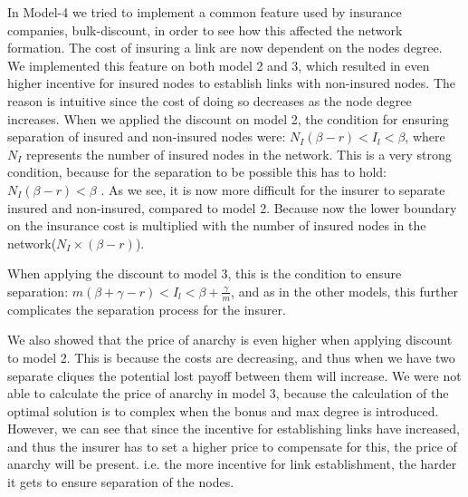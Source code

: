 In Model-4 we tried to implement a common feature used by insurance companies, bulk-discount, in order to see how this affected the network formation. The cost of insuring a link are now dependent on the nodes degree. We implemented this feature on both model 2 and 3, which resulted in even higher incentive for insured nodes to establish links with non-insured nodes. The reason is intuitive since the cost of doing so decreases as the node degree increases. 
When we applied the discount on model 2, the condition for ensuring separation of insured and non-insured nodes were: $N_{I}(\beta-r)<I_{l}<\beta$, where $N_{I}$ represents the number of insured nodes in the network. This is a very strong condition, because for the separation to be possible this has to hold: $N_{I}(\beta-r)<\beta$ . As we see, it is now more difficult for the insurer to separate insured and non-insured, compared to model 2. Because now the lower boundary on the insurance cost is multiplied with the number of insured nodes in the network($N_{I}\times(\beta-r)$).

When applying the discount to model 3, this is the condition to ensure separation: $m(\beta+\gamma-r)<I_{l}<\beta+\frac{\gamma}{m}$, and as in the other models, this further complicates the separation process for the insurer. 

We also showed that the price of anarchy is even higher when applying discount to model 2. This is because the costs are decreasing, and thus when we have two separate cliques the potential lost payoff between them will increase.
We were not able to calculate the price of anarchy in model 3, because the calculation of the optimal solution is to complex when the bonus and max degree is introduced. However, we can see that since the incentive for establishing links have increased, and thus the insurer has to set a higher price to compensate for this, the price of anarchy will be present. i.e. the more incentive for link establishment, the harder it gets to ensure separation of the nodes.  

